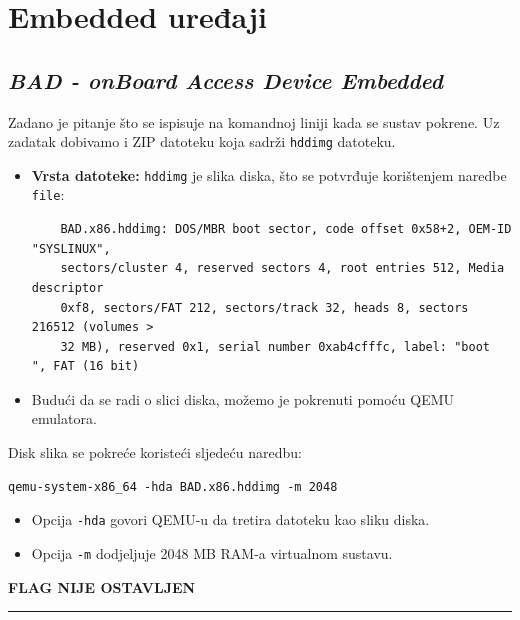 \documentclass{article}
\begin{document}
\section{Embedded uređaji}
\label{sec:embedded}
\subsection{\textit{BAD - onBoard Access Device Embedded}}
\begin{tcolorbox}[
    colback=gray!5,  %
    colframe=gray!75,  %
    title=\textbf{Zadatak}]
    Zadano je pitanje što se ispisuje na komandnoj liniji kada se sustav pokrene. Uz zadatak dobivamo i ZIP datoteku koja sadrži \texttt{hddimg} datoteku.
\end{tcolorbox}

\begin{itemize}
    \item \textbf{Vrsta datoteke:} \texttt{hddimg} je slika diska, što se potvrđuje korištenjem naredbe \texttt{file}:
    \begin{verbatim}
    BAD.x86.hddimg: DOS/MBR boot sector, code offset 0x58+2, OEM-ID "SYSLINUX", 
    sectors/cluster 4, reserved sectors 4, root entries 512, Media descriptor 
    0xf8, sectors/FAT 212, sectors/track 32, heads 8, sectors 216512 (volumes > 
    32 MB), reserved 0x1, serial number 0xab4cfffc, label: "boot    ", FAT (16 bit)
    \end{verbatim}
    \item Budući da se radi o slici diska, možemo je pokrenuti pomoću QEMU emulatora.
\end{itemize}

Disk slika se pokreće koristeći sljedeću naredbu:
\begin{verbatim}
qemu-system-x86_64 -hda BAD.x86.hddimg -m 2048
\end{verbatim}

\begin{itemize}
    \item Opcija \texttt{-hda} govori QEMU-u da tretira datoteku kao sliku diska.
    \item Opcija \texttt{-m} dodjeljuje 2048 MB RAM-a virtualnom sustavu.
\end{itemize}

\begin{center}
    \textbf{FLAG NIJE OSTAVLJEN}
\end{center}

\noindent\rule{\textwidth}{0.4pt}
\end{document}
